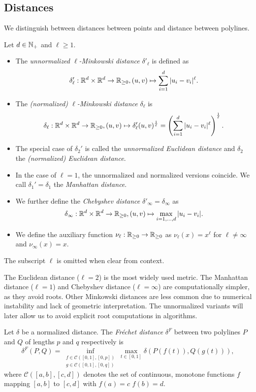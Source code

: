 \subsection{Distances}
\label{ssec:distances}
We distinguish between distances between points and distance between polylines. 

\begin{definition}[Distances]\label{def:point_distance}
  Let \(d \in \mathbb{N}_+\) and \(\ell \geq 1\).
  \begin{itemize}
    \item The \emph{unnormalized \(\ell\)-Minkowski distance} \(\delta'_\ell\) is defined as 
      \[\delta'_\ell:\mathbb{R}^d \times \mathbb{R}^d \to \mathbb{R}_{\geq 0}, (u, v) \mapsto \sum_{i = 1}^d |u_i - v_i|^\ell.\]
    \item The \emph{(normalized) \(\ell\)-Minkowski distance} \(\delta_\ell\) is 
      \[\delta_\ell:\mathbb{R}^d \times \mathbb{R}^d \to \mathbb{R}_{\geq 0}, (u, v) \mapsto \delta'_\ell(u, v)^{\frac1\ell} = \left(\sum_{i = 1}^d |u_i - v_i|^\ell\right)^{\frac1\ell}.\]
    \item The special case of \(\delta_2'\) is called the \emph{unnormalized Euclidean distance} and \(\delta_2\) the \emph{(normalized) Euclidean distance}.
    \item In the case of \(\ell = 1\), the unnormalized and normalized versions coincide. We call \(\delta_1' = \delta_1\) the \emph{Manhattan distance}. 
    \item We further define the \emph{Chebyshev distance} \(\delta'_\infty = \delta_\infty\) as 
      \[\delta_\infty:\mathbb{R}^d \times \mathbb{R}^d \to \mathbb{R}_{\geq 0}, (u, v) \mapsto \max_{i = 1, \dots, d} |u_i - v_i|.\]
    \item We define the auxiliary function \(\nu_\ell:\mathbb{R}_{\geq 0} \to \mathbb{R}_{\geq 0}\) as \(\nu_\ell(x) = x^\ell\) for \(\ell \neq \infty\) and \(\nu_\infty(x) = x\).
  \end{itemize}

  The subscript \(\ell\) is omitted when clear from context.
\end{definition}

The Euclidean distance (\(\ell = 2\)) is the most widely used metric. The Manhattan distance (\(\ell = 1\)) and Chebyshev distance (\(\ell = \infty\)) are computationally simpler, as they avoid roots. 
Other Minkowski distances are less common due to numerical instability and lack of geometric interpretation. The unnormalized variants will later allow us to avoid explicit root computations in algorithms. 

\begin{definition}
  Let \(\delta\) be a normalized distance. The \emph{Fréchet distance} \(\delta^F\) between two polylines \(P\) and \(Q\) of lengths \(p\) and \(q\) respectively is 
	\[\delta^F(P, Q) = \inf_{\substack{f \in \mathcal{C}([0,1], [0, p]) \\ g \in \mathcal{C}([0,1], [0, q])}} \max_{t \in [0,1]}\delta(P(f(t)), Q(g(t))),\]
	where \(\mathcal{C}([a,b], [c,d])\) denotes the set of continuous, monotone functions \(f\) mapping \([a,b]\) to \([c,d]\) with \(f(a) = c\) \(f(b) = d\).
\end{definition}

